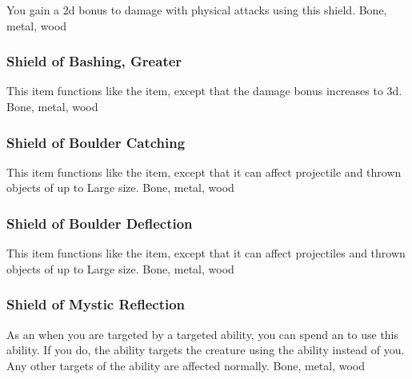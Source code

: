 You gain a \plus2d bonus to damage with physical attacks using this shield.
 
 Bone, metal, wood
\lowercase{\hypertarget{item:Shield of Bashing, Greater}{}}\label{item:Shield of Bashing, Greater}
\hypertarget{item:Shield of Bashing, Greater}{\subsubsection{Shield of Bashing, Greater\hfill{}}}
This item functions like the  item, except that the damage bonus increases to \plus3d.
 
 Bone, metal, wood
\lowercase{\hypertarget{item:Shield of Boulder Catching}{}}\label{item:Shield of Boulder Catching}
\hypertarget{item:Shield of Boulder Catching}{\subsubsection{Shield of Boulder Catching\hfill{}}}
This item functions like the  item, except that it can affect projectile and thrown objects of up to Large size.
 
 Bone, metal, wood
\lowercase{\hypertarget{item:Shield of Boulder Deflection}{}}\label{item:Shield of Boulder Deflection}
\hypertarget{item:Shield of Boulder Deflection}{\subsubsection{Shield of Boulder Deflection\hfill{}}}
This item functions like the  item, except that it can affect projectiles and thrown objects of up to Large size.
 
 Bone, metal, wood
\lowercase{\hypertarget{item:Shield of Mystic Reflection}{}}\label{item:Shield of Mystic Reflection}
\hypertarget{item:Shield of Mystic Reflection}{\subsubsection{Shield of Mystic Reflection\hfill{}}}
As an  when you are targeted by a targeted  ability, you can spend an  to use this ability.
If you do, the ability targets the creature using the ability instead of you.
Any other targets of the ability are affected normally.
 
 Bone, metal, wood
